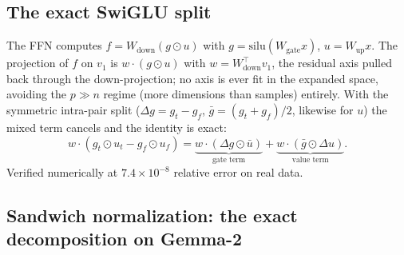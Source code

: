 \documentclass[11pt]{article}
\begin{document}
\subsection{The exact SwiGLU split}
\label{b:sec:swiglu}

The FFN computes $f = W_{\mathrm{down}}(g \odot u)$ with
$g = \mathrm{silu}(W_{\mathrm{gate}} x)$, $u = W_{\mathrm{up}} x$. The
projection of $f$ on $v_1$ is $w \cdot (g \odot u)$ with
$w = W_{\mathrm{down}}^{\top} v_1$, the residual axis pulled back through
the down-projection; no axis is ever fit in the expanded space, avoiding the
$p \gg n$ regime (more dimensions than samples) entirely. With the symmetric
intra-pair split ($\Delta g = g_t - g_f$, $\bar g = (g_t + g_f)/2$, likewise
for $u$) the mixed term cancels and the identity is exact:
\begin{equation}
w \cdot (g_t \odot u_t - g_f \odot u_f)
= \underbrace{w \cdot (\Delta g \odot \bar u)}_{\text{gate term}}
+ \underbrace{w \cdot (\bar g \odot \Delta u)}_{\text{value term}}.
\label{b:eq:split}
\end{equation}
Verified numerically at $7.4 \times 10^{-8}$ relative error on real data.

\subsection{Sandwich normalization: the exact decomposition on Gemma-2}
\label{b:sec:sandwich}
\end{document}
